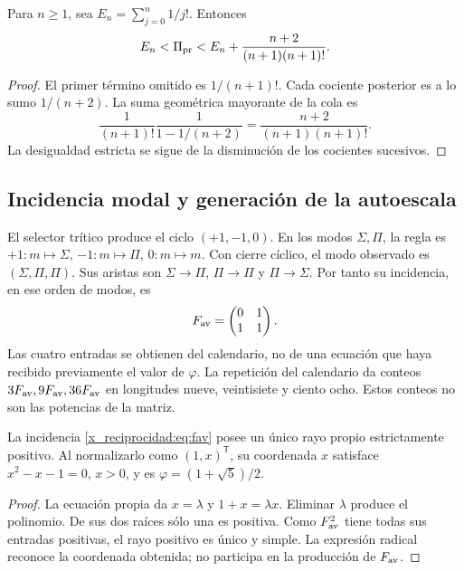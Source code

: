 \begin{proposition}
Para \(n\ge1\), sea \(E_n=\sum_{j=0}^n1/j!\). Entonces
\[
 E_n<\Pi_{\rm pr}<E_n+\frac{n+2}{(n+1)(n+1)!}.
\]
\end{proposition}
\begin{proof}
El primer término omitido es \(1/(n+1)!\). Cada cociente posterior es a lo sumo \(1/(n+2)\). La suma geométrica mayorante de la cola es
\[
 \frac1{(n+1)!}\frac1{1-1/(n+2)}
 =\frac{n+2}{(n+1)(n+1)!}.
\]
La desigualdad estricta se sigue de la disminución de los cocientes sucesivos.
\end{proof}

\subsection{Incidencia modal y generación de la autoescala}

El selector trítico produce el ciclo \((+1,-1,0)\). En los modos \(\Sigma,\Pi\), la regla es \(+1:m\mapsto\Sigma\), \(-1:m\mapsto\Pi\), \(0:m\mapsto m\). Con cierre cíclico, el modo observado es \((\Sigma,\Pi,\Pi)\). Sus aristas son \(\Sigma\to\Pi\), \(\Pi\to\Pi\) y \(\Pi\to\Sigma\). Por tanto su incidencia, en ese orden de modos, es
\begin{equation}
 F_{\rm av}=\begin{pmatrix}0&1\\1&1\end{pmatrix}.
 \label{x_reciprocidad:eq:fav}
\end{equation}
Las cuatro entradas se obtienen del calendario, no de una ecuación que haya recibido previamente el valor de \(\varphi\). La repetición del calendario da conteos \(3F_{\rm av},9F_{\rm av},36F_{\rm av}\) en longitudes nueve, veintisiete y ciento ocho. Estos conteos no son las potencias de la matriz.

\begin{theorem}
La incidencia \eqref{x_reciprocidad:eq:fav} posee un único rayo propio estrictamente positivo. Al normalizarlo como \((1,x)^{\mathsf T}\), su coordenada \(x\) satisface \(x^2-x-1=0\), \(x>0\), y es \(\varphi=(1+\sqrt5)/2\).
\end{theorem}
\begin{proof}
La ecuación propia da \(x=\lambda\) y \(1+x=\lambda x\). Eliminar \(\lambda\) produce el polinomio. De sus dos raíces sólo una es positiva. Como \(F_{\rm av}^2\) tiene todas sus entradas positivas, el rayo positivo es único y simple. La expresión radical reconoce la coordenada obtenida; no participa en la producción de \(F_{\rm av}\).
\end{proof}

